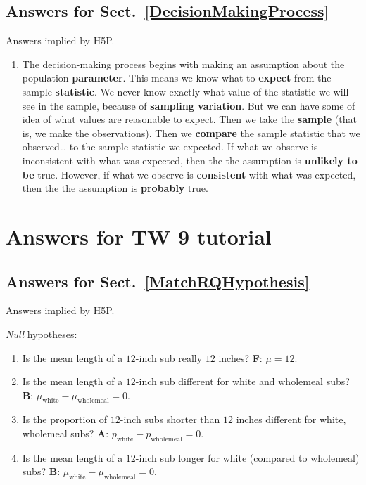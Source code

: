 \documentclass[
  11pt,
  a4paper,
  krantz2]{krantz}
\providecommand{\tightlist}{%
  \setlength{\itemsep}{0pt}\setlength{\parskip}{0pt}}
\begin{document}
\begin{footnotesize}
\subsection*{Answers for Sect.~\ref{DecisionMakingProcess}}\label{answers-for-sect.-refdecisionmakingprocess}

Answers implied by H5P.

\begin{enumerate}
\def\labelenumi{\arabic{enumi}.}
\tightlist
\item
  The decision-making process begins with making an assumption about the population \textbf{parameter}.
  This means we know what to \textbf{expect} from the sample \textbf{statistic}. We never know exactly what value of the statistic we will see in the sample, because of \textbf{sampling variation}.
  But we can have some of idea of what values are reasonable to expect.
  Then we take the \textbf{sample} (that is, we make the observations).
  Then we \textbf{compare} the sample statistic that we observed\ldots{} to the sample statistic we expected.
  If what we observe is inconsistent with what was expected, then the the assumption is \textbf{unlikely to be} true.
  However, if what we observe is \textbf{consistent} with what was expected, then the the assumption is \textbf{probably} true.
\end{enumerate}

\section{Answers for TW 9 tutorial}\label{Lecture9Answers}

\subsection*{Answers for Sect.~\ref{MatchRQHypothesis}}\label{answers-for-sect.-refmatchrqhypothesis}

Answers implied by H5P.

\emph{Null} hypotheses:

\begin{enumerate}
\def\labelenumi{\arabic{enumi}.}
\tightlist
\item
  Is the mean length of a \(12\)-inch sub really \(12\) inches?
  \textbf{F}: \(\mu = 12\).
\item
  Is the mean length of a \(12\)-inch sub different for white and wholemeal subs?
  \textbf{B}: \(\mu_{\text{white}} - \mu_{\text{wholemeal}} = 0\).
\item
  Is the proportion of \(12\)-inch subs shorter than \(12\) inches different for white, wholemeal subs?
  \textbf{A}: \(p_{\text{white}} - p_{\text{wholemeal}} = 0\).
\item
  Is the mean length of a \(12\)-inch sub longer for white (compared to wholemeal) subs?
  \textbf{B}: \(\mu_{\text{white}} - \mu_{\text{wholemeal}} = 0\).
\end{enumerate}


\end{footnotesize}
\end{document}
